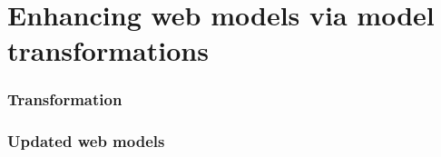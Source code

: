 \chead{}

\chapter{Enhancing web models via model transformations}

\subsection{Transformation}

\subsection{Updated web models}


